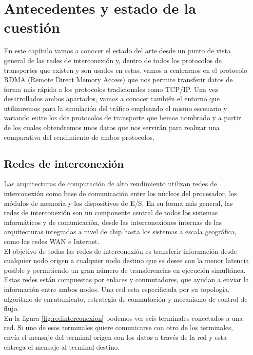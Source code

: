 \chapter{Antecedentes y estado de la cuestión}
En este capítulo vamos a conocer el estado del arte desde un punto de vista general de las redes de interconexión y, dentro de todos los protocolos de transportes que existen y son usados en estas, vamos a centrarnos en el protocolo RDMA (Remote Direct Memory Access) que nos permite transferir datos de forma más rápida a los protocolos tradicionales como TCP/IP. Una vez desarrollados ambos apartados, vamos a conocer también el entorno que utilizaremos para la simulación del tráfico empleando el mismo escenario y variando entre los dos protocolos de transporte que hemos nombrado y a partir de los cuales obtendremos unos datos que nos servirán para realizar una comparativa del rendimiento de ambos protocolos.

\section{Redes de interconexión}
Las arquitecturas de computación de alto rendimiento utilizan redes de interconexión como base de comunicación entre los núcleos del procesador, los módulos de memoria y los dispositivos de E/S. En su forma más general, las redes de interconexión son un componente central de todos los sistemas informáticos y de comunicación, desde las interconexiones internas de las arquitecturas integradas a nivel de chip hasta los sistemas a escala geográfica, como las redes WAN e Internet. \\

El objetivo de todas las redes de interconexión es transferir información desde cualquier nodo origen a cualquier nodo destino que se desee con la menor latencia posible y permitiendo un gran número de transferencias en ejecución simultánea.\\

Estas redes están compuestas por enlaces y conmutadores, que ayudan a enviar la información entre ambos nodos. Una red esta especificada por su topología, algoritmo de enrutamiento, estrategia de conmutación y mecanismo de control de flujo.\cite{Interconnection}\\

En la figura \ref{fig:redinterconexion} podemos ver seis terminales conectados a una red. Si uno de esos terminales quiere comunicarse con otro de los terminales, envía el mensaje del terminal origen con los datos a través de la red y esta entrega el mensaje al terminal destino.

